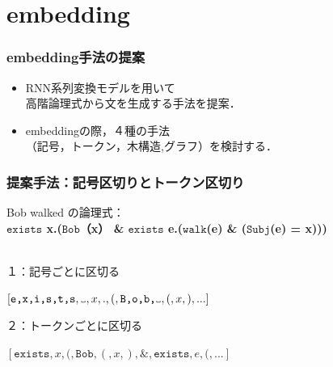 \documentclass[dvipdfmx]{beamer}
\newcommand{\LF}[1]{\ensuremath{\texttt{#1}}}
\newcommand\vartextvisiblespace[1][.5em]{%
  \makebox[#1]{%
    \kern.07em
    \vrule height.3ex
    \hrulefill
    \vrule height.3ex
    \kern.07em
  }%
}
\begin{document}


\section{embedding}
\begin{frame}
\frametitle{embedding手法の提案}
\begin{center}
\end{center}
\begin{itemize}
  \item RNN系列変換モデルを用いて\\高階論理式から文を生成する手法を提案．
  \item embeddingの際，４種の手法\\{\color{berry}（記号，トークン，木構造,グラフ）}を検討する．
\end{itemize}

\end{frame}


\begin{frame}
\frametitle{提案手法：記号区切りとトークン区切り}
Bob walked の論理式：\\
\textbf{
  \LF{exists} x.(\LF{Bob}（x） \& \LF{exists} e.(\LF{walk}(e) \& (\LF{Subj}(e) = x)))
}
\\~\
\begin{block}{１：記号ごとに区切る}
\begin{center}
$[\LF{e,x,i,s,t,s}, {\tt \vartextvisiblespace}, x,.,(,\LF{B,o,b,}{\tt \vartextvisiblespace},(,x,),...]$
\end{center}
\end{block}
\begin{block}{２：トークンごとに区切る}
\begin{center}
  $[\LF{exists},x,(,\LF{Bob},(,x,),\&,\LF{exists},e,(,...]$
\end{center}
\end{block}
\end{frame}
\end{document}

